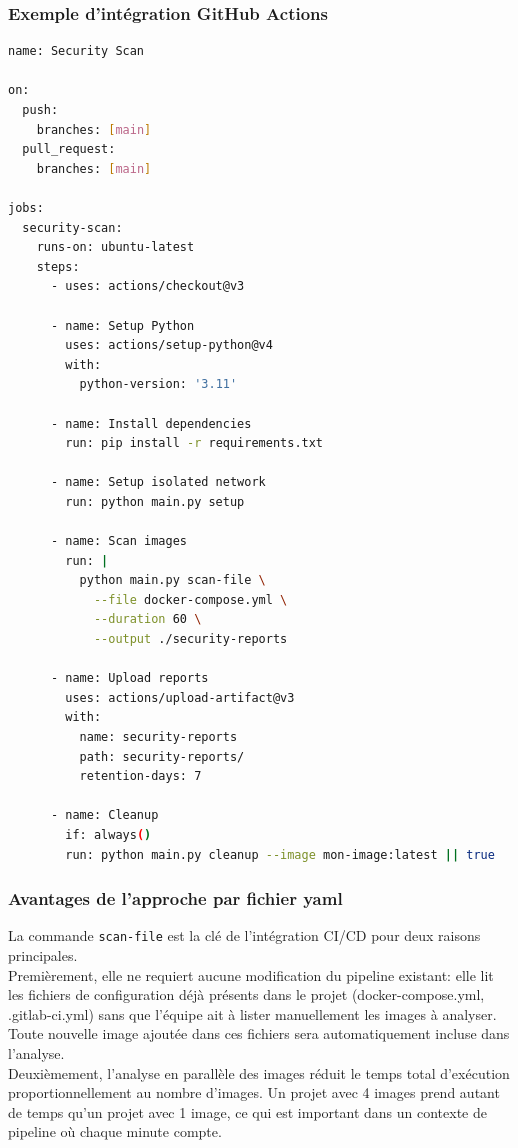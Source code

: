 \subsubsection{Exemple d'intégration GitHub Actions}
\begin{lstlisting}[language=bash, caption=Exemple intégration GitHub Actions]
name: Security Scan

on:
  push:
    branches: [main]
  pull_request:
    branches: [main]

jobs:
  security-scan:
    runs-on: ubuntu-latest
    steps:
      - uses: actions/checkout@v3

      - name: Setup Python
        uses: actions/setup-python@v4
        with:
          python-version: '3.11'

      - name: Install dependencies
        run: pip install -r requirements.txt

      - name: Setup isolated network
        run: python main.py setup

      - name: Scan images
        run: |
          python main.py scan-file \
            --file docker-compose.yml \
            --duration 60 \
            --output ./security-reports

      - name: Upload reports
        uses: actions/upload-artifact@v3
        with:
          name: security-reports
          path: security-reports/
          retention-days: 7

      - name: Cleanup
        if: always()
        run: python main.py cleanup --image mon-image:latest || true
\end{lstlisting}

\subsubsection{Avantages de l'approche par fichier yaml}
La commande \texttt{scan-file} est la clé de l'intégration CI/CD pour deux raisons principales. \\

Premièrement, elle ne requiert aucune modification du pipeline existant: elle lit les fichiers de configuration déjà présents dans le projet (docker-compose.yml, .gitlab-ci.yml) sans que l'équipe ait à lister manuellement les images à analyser. Toute nouvelle image ajoutée dans ces fichiers sera automatiquement incluse dans l'analyse. \\

Deuxièmement, l'analyse en parallèle des images réduit le temps total d'exécution proportionnellement au nombre d'images. Un projet avec 4 images prend autant de temps qu'un projet avec 1 image, ce qui est important dans un contexte de pipeline où chaque minute compte.

